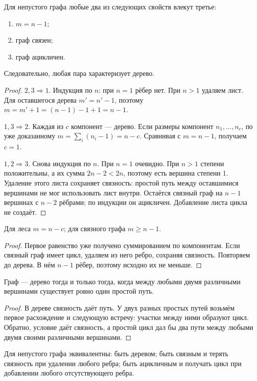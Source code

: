 \begin{theorem}
Для непустого графа любые два из следующих свойств влекут третье:
\begin{enumerate}[nosep]
\item \(m=n-1\);
\item граф связен;
\item граф ацикличен.
\end{enumerate}
Следовательно, любая пара характеризует дерево.
\end{theorem}
\begin{proof}
\(2,3\Rightarrow1\). Индукция по \(n\): при \(n=1\) рёбер нет.
При \(n>1\) удаляем лист. Для оставшегося дерева \(m'=n'-1\),
поэтому \(m=m'+1=(n-1)-1+1=n-1\).

\(1,3\Rightarrow2\). Каждая из \(c\) компонент — дерево.
Если размеры компонент \(n_1,\ldots,n_c\), по уже доказанному
\(m=\sum_i(n_i-1)=n-c\). Сравнивая с \(m=n-1\), получаем \(c=1\).

\(1,2\Rightarrow3\). Снова индукция по \(n\). При \(n=1\) очевидно.
При \(n>1\) степени положительны, а их сумма \(2n-2<2n\),
поэтому есть вершина степени 1. Удаление этого листа сохраняет связность:
простой путь между оставшимися вершинами не мог использовать лист внутри.
Остаётся связный граф на \(n-1\) вершинах с \(n-2\) рёбрами; по индукции
он ацикличен. Добавление листа цикла не создаёт.
\end{proof}
\begin{cor}\label{lem:forest}
Для леса \(m=n-c\); для связного графа \(m\ge n-1\).
\end{cor}
\begin{proof}
Первое равенство уже получено суммированием по компонентам.
Если связный граф имеет цикл, удаляем из него ребро, сохраняя связность.
Повторяем до дерева. В нём \(n-1\) рёбер, поэтому исходно их не меньше.
\end{proof}
\begin{theorem}
Граф — дерево тогда и только тогда, когда между любыми двумя различными
вершинами существует ровно один простой путь.
\end{theorem}
\begin{proof}
В дереве связность даёт путь. У двух разных простых путей возьмём
первое расхождение и следующую встречу: участки между ними образуют цикл.
Обратно, условие даёт связность, а простой цикл дал бы два пути
между любыми двумя своими различными вершинами.
\end{proof}
\begin{theorem}
Для непустого графа эквивалентны: быть деревом; быть связным и терять
связность при удалении любого ребра; быть ацикличным и получать цикл
при добавлении любого отсутствующего ребра.
\end{theorem}
